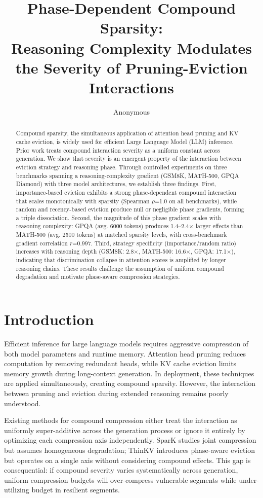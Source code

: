 \documentclass[11pt,a4paper]{article}
\title{Phase-Dependent Compound Sparsity: \\Reasoning Complexity Modulates the Severity of Pruning-Eviction Interactions}
\author{Anonymous}
\date{}
\begin{document}
\maketitle

\begin{abstract}
Compound sparsity, the simultaneous application of attention head pruning and KV cache eviction, is widely used for efficient Large Language Model (LLM) inference. Prior work treats compound interaction severity as a uniform constant across generation. We show that severity is an emergent property of the interaction between eviction strategy and reasoning phase. Through controlled experiments on three benchmarks spanning a reasoning-complexity gradient (GSM8K, MATH-500, GPQA Diamond) with three model architectures, we establish three findings. First, importance-based eviction exhibits a strong phase-dependent compound interaction that scales monotonically with sparsity (Spearman $\rho$=1.0 on all benchmarks), while random and recency-based eviction produce null or negligible phase gradients, forming a triple dissociation. Second, the magnitude of this phase gradient scales with reasoning complexity: GPQA (avg. 6000 tokens) produces 1.4--2.4$\times$ larger effects than MATH-500 (avg. 2500 tokens) at matched sparsity levels, with cross-benchmark gradient correlation $r$=0.997. Third, strategy specificity (importance/random ratio) increases with reasoning depth (GSM8K: 2.8$\times$, MATH-500: 16.6$\times$, GPQA: 17.1$\times$), indicating that discrimination collapse in attention scores is amplified by longer reasoning chains. These results challenge the assumption of uniform compound degradation and motivate phase-aware compression strategies.
\end{abstract}

\section{Introduction}

Efficient inference for large language models requires aggressive compression of both model parameters and runtime memory. Attention head pruning reduces computation by removing redundant heads, while KV cache eviction limits memory growth during long-context generation. In deployment, these techniques are applied simultaneously, creating compound sparsity. However, the interaction between pruning and eviction during extended reasoning remains poorly understood.

Existing methods for compound compression either treat the interaction as uniformly super-additive across the generation process or ignore it entirely by optimizing each compression axis independently. SparK studies joint compression but assumes homogeneous degradation; ThinKV introduces phase-aware eviction but operates on a single axis without considering compound effects. This gap is consequential: if compound severity varies systematically across generation, uniform compression budgets will over-compress vulnerable segments while under-utilizing budget in resilient segments.
\end{document}
